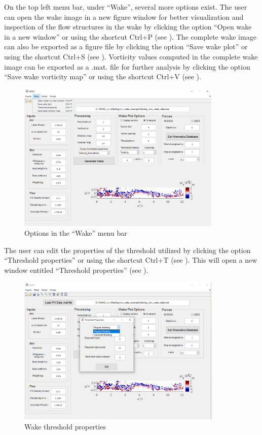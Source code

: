 \documentclass[12pt,a4paper]{article}
\begin{document}
On the top left menu bar, under ``Wake'', several more options exist.
The user can open the wake image in a new figure window for better visualization and inspection of the flow structures in the wake by clicking the option ``Open wake in a new window'' or using the shortcut Ctrl+P (see ).
The complete wake image can also be exported as a figure file by clicking the option ``Save wake plot'' or using the shortcut Ctrl+S (see ).
Vorticity values computed in the complete wake image can be exported as a .mat. file for further analysis by clicking the option ``Save wake vorticity map'' or using the shortcut Ctrl+V (see ).
  
  \newpage
 \begin{figure}[ht!]
 	\centering
 	\includegraphics[width=0.87\textwidth]{Wake-menuber-options}
 	\caption{Options in the ``Wake'' menu bar}
 	\label{fig:GUI-wake-menubar}
 \end{figure}

The user can edit the properties of the threshold utilized by clicking the option ``Threshold properties'' or using the shortcut Ctrl+T (see ). 
This will open a new window entitled ``Threshold properties'' (see ). 

\begin{figure}[ht!]
	\centering
	\includegraphics[width=0.87\textwidth]{Wake-threshold-properties}
	\caption{Wake threshold properties}
	\label{fig:GUI-Wake-threshold-properties}
\end{figure}
\end{document}
